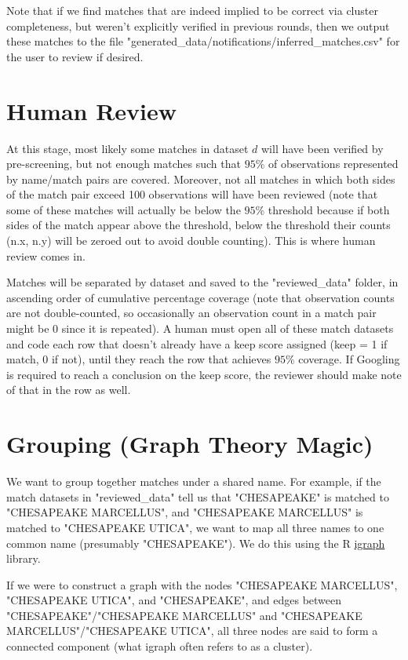 \documentclass{article}
\begin{document}
Note that if we find matches that are indeed implied to be correct via cluster completeness, but weren't explicitly verified in previous rounds, then we output these matches to the file "generated\_data/notifications/inferred\_matches.csv" for the user to review if desired. 

\section{Human Review}

At this stage, most likely some matches in dataset $d$ will have been verified by pre-screening, but not enough matches such that $95\%$ of observations represented by name/match pairs are covered. Moreover, not all matches in which both sides of the match pair exceed 100 observations will have been reviewed (note that some of these matches will actually be below the $95\%$ threshold because if both sides of the match appear above the threshold, below the threshold their counts (n.x, n.y) will be zeroed out to avoid double counting). This is where human review comes in. 

Matches will be separated by dataset and saved to the "reviewed\_data" folder, in ascending order of cumulative percentage coverage (note that observation counts are not double-counted, so occasionally an observation count in a match pair might be 0 since it is repeated). A human must open all of these match datasets and code each row that doesn't already have a keep score assigned (keep = 1 if match, 0 if not), until they reach the row that achieves $95\%$ coverage. If Googling is required to reach a conclusion on the keep score, the reviewer should make note of that in the row as well. 

\section{Grouping (Graph Theory Magic)}
\label{sec:graph-theory}

We want to group together matches under a shared name. For example, if the match datasets in "reviewed\_data" tell us that "CHESAPEAKE" is matched to "CHESAPEAKE MARCELLUS", and "CHESAPEAKE MARCELLUS" is matched to "CHESAPEAKE UTICA", we want to map all three names to one common name (presumably "CHESAPEAKE"). We do this using the R \href{https://cran.r-project.org/web/packages/igraph/igraph.pdf}{igraph} library. 

If we were to construct a graph with the nodes "CHESAPEAKE MARCELLUS", "CHESAPEAKE UTICA", and "CHESAPEAKE", and edges between "CHESAPEAKE"/"CHESAPEAKE MARCELLUS" and "CHESAPEAKE MARCELLUS"/"CHESAPEAKE UTICA", all three nodes are said to form a connected component (what igraph often refers to as a cluster). 
\end{document}
